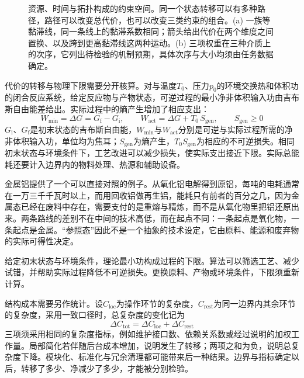 \begin{figure}[ht]


\caption{资源、时间与拓扑构成的约束空间。同一个状态转移可以有多种路径，路径可以改变总代价，也可以改变三类约束的组合。(a) 一族等黏滞线，同一条线上的黏滞系数相同；箭头给出代价在两个维度之间置换、以及跨到更高黏滞线这两种运动。(b) 三项权重在三种介质上的次序，它列出待检验的机制预期，具体次序与大小均须由任务数据确定。}
\label{fig:rtg-space}
\end{figure}


代价的转移与物理下限需要分开核算。对与温度$T_0$、压力$p_0$的环境交换热和体积功的闭合反应系统，给定反应物与产物状态，可逆过程的最小净非体积输入功由吉布斯自由能差给出。实际过程中的熵产生增加了相应支出：
\begin{equation}
W_{\min}=\Delta G=G_{\mathrm{f}}-G_{\mathrm{i}},
\qquad
W_{\mathrm{act}}=\Delta G+T_{0}\,S_{\mathrm{gen}},
\qquad
S_{\mathrm{gen}}\ge 0
\label{eq:thermo-floor}
\end{equation}
$G_{\mathrm{i}}$、$G_{\mathrm{f}}$是初末状态的吉布斯自由能，$W_{\min}$与$W_{\mathrm{act}}$分别是可逆与实际过程所需的净非体积输入功，单位均为焦耳；$S_{\mathrm{gen}}$为熵产生，$T_0S_{\mathrm{gen}}$为相应的不可逆损失。相同初末状态与环境条件下，工艺改进可以减少损失，使实际支出接近下限。实际总能耗还要计入边界内的物料处理、热源和辅助设备。

金属铝提供了一个可以直接对照的例子。从氧化铝电解得到原铝，每吨的电耗通常在一万三千千瓦时以上，而用回收铝做再生铝，能耗只有前者的百分之几，因为金属态已经在废料中存在，需要支付的是重熔与精炼，而不是从氧化物里把铝还原出来\cite{quinkertz2001scenario}。两条路线的差别不在中间的技术高低，而在起点不同：一条起点是氧化物，一条起点是金属。“参照态”因此不是一个抽象的技术设定，它由原料、能源和废弃物的实际可得性决定。

给定初末状态与环境条件，理论最小功构成过程的下限。算法可以筛选工艺、减少试错，并帮助实际过程降低不可逆损失。更换原料、产物或环境条件，下限须重新计算。

结构成本需要另作统计。设$C_{\mathrm{loc}}$为操作环节的复杂度，$C_{\mathrm{rest}}$为同一边界内其余环节的复杂度，采用一致口径时，总复杂度的变化记为
\begin{equation}
\Delta C_{\mathrm{tot}}=\Delta C_{\mathrm{loc}}+\Delta C_{\mathrm{rest}}
\label{eq:complexity-transfer}
\end{equation}
三项须采用相同的复杂度指标，例如维护接口数、依赖关系数或经过说明的加权工作量。局部简化若伴随后台成本增加，说明发生了转移；两项之和为负，说明总复杂度下降。模块化、标准化与冗余清理都可能带来后一种结果。边界与指标确定以后，转移了多少、净减少了多少，才能被分别检验。

